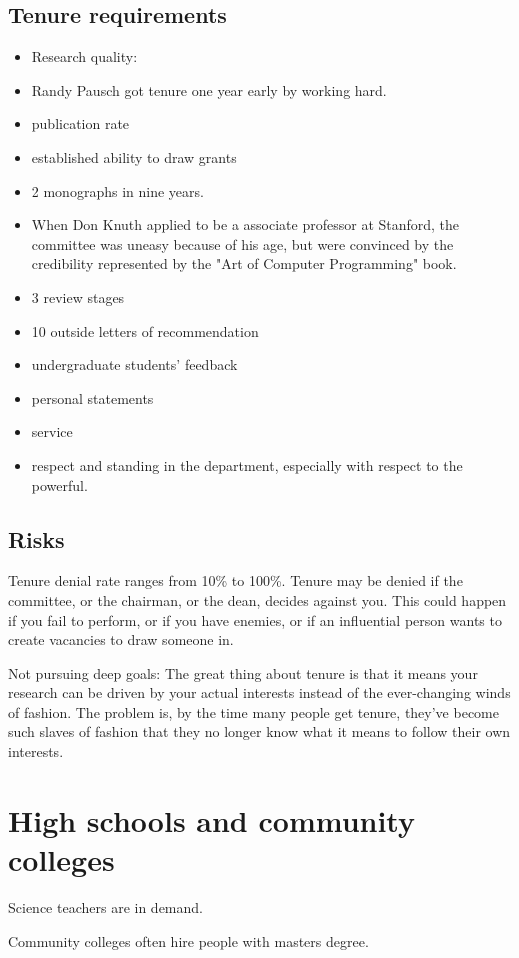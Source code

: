 \documentclass[oneside, article]{memoir}
\begin{document}
\subsection{Tenure requirements}
\begin{itemize}

\item Research quality:
\item Randy Pausch got tenure one year early by working hard.
\item publication rate
\item established ability to draw grants
\item 2 monographs in nine years.
\item When Don Knuth applied to be a associate professor at Stanford, the committee was uneasy because of his age, but were convinced by the credibility represented by the "Art of Computer Programming" book.
\item 3 review stages
\item 10 outside letters of recommendation
\item undergraduate students' feedback
\item personal statements
\item service
\item respect and standing in the department, especially with respect to the powerful.
\end{itemize}

\subsection{Risks}

Tenure denial rate ranges from 10\% to 100\%. Tenure may be denied if the committee, or the chairman, or the dean, decides against you. This could happen if you fail to perform, or if you have enemies, or if an influential person wants to create vacancies to draw someone in.

Not pursuing deep goals: The great thing about tenure is that it means your research can be driven by your actual interests instead of the ever-changing winds of fashion. The problem is, by the time many people get tenure, they've become such slaves of fashion that they no longer know what it means to follow their own interests.

\section{High schools and community colleges}
Science teachers are in demand.

Community colleges often hire people with masters degree.
\end{document}
